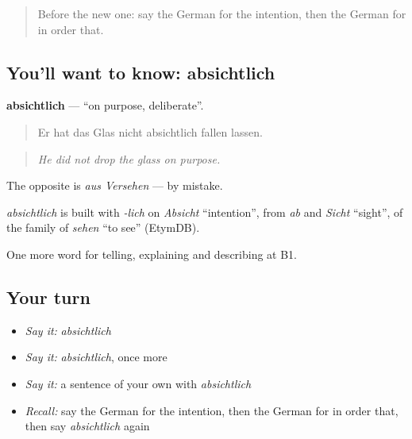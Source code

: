 \label{lesson:GE-C346-absichtlich}



\begin{quote}
Before the new one: say the German for the intention, then the German for in order that.
\end{quote}

\subsection*{You'll want to know: absichtlich}
\textbf{absichtlich} — \textquotedblleft{}on purpose, deliberate\textquotedblright{}.

\begin{quote}
Er hat das Glas nicht absichtlich fallen lassen.
\end{quote}

\begin{quote}
\emph{He did not drop the glass on purpose.}
\end{quote}

The opposite is \emph{aus Versehen} — by mistake.

\begin{cousinweb}
\emph{absichtlich} is built with \emph{-lich} on \emph{Absicht} \textquotedblleft{}intention\textquotedblright{}, from \emph{ab} and \emph{Sicht} \textquotedblleft{}sight\textquotedblright{}, of the family of \emph{sehen} \textquotedblleft{}to see\textquotedblright{} (EtymDB).
\end{cousinweb}

\begin{grammarlens}[title={What you've built}]
One more word for telling, explaining and describing at B1.
\end{grammarlens}

\subsection*{Your turn}
\begin{itemize}
\raggedright
  \item \emph{Say it:} \emph{absichtlich}
  \item \emph{Say it:} \emph{absichtlich}, once more
  \item \emph{Say it:} a sentence of your own with \emph{absichtlich}
  \item \emph{Recall:} say the German for the intention, then the German for in order that, then say \emph{absichtlich} again
\end{itemize}

